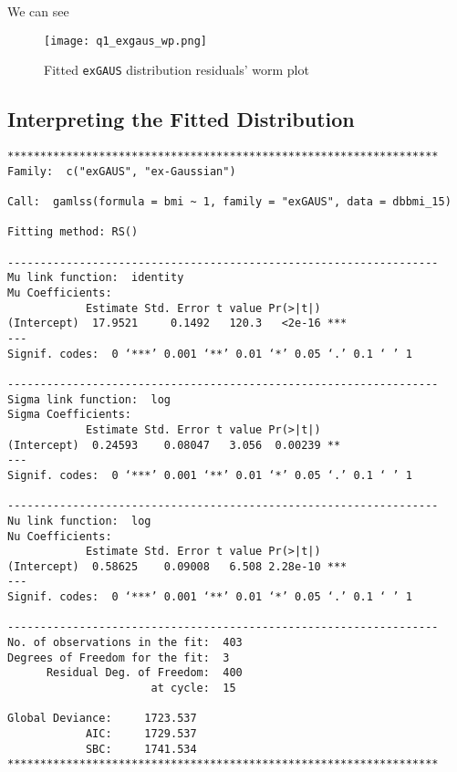 We can see

\begin{figure}[H]
  \texttt{[image: q1\_exgaus\_wp.png]}
  \caption{Fitted \texttt{exGAUS} distribution residuals' worm plot}
\end{figure}

\subsection{Interpreting the Fitted Distribution}

\begin{table}[H]
\begin{verbatim}
******************************************************************
Family:  c("exGAUS", "ex-Gaussian")

Call:  gamlss(formula = bmi ~ 1, family = "exGAUS", data = dbbmi_15)

Fitting method: RS()

------------------------------------------------------------------
Mu link function:  identity
Mu Coefficients:
            Estimate Std. Error t value Pr(>|t|)
(Intercept)  17.9521     0.1492   120.3   <2e-16 ***
---
Signif. codes:  0 ‘***’ 0.001 ‘**’ 0.01 ‘*’ 0.05 ‘.’ 0.1 ‘ ’ 1

------------------------------------------------------------------
Sigma link function:  log
Sigma Coefficients:
            Estimate Std. Error t value Pr(>|t|)
(Intercept)  0.24593    0.08047   3.056  0.00239 **
---
Signif. codes:  0 ‘***’ 0.001 ‘**’ 0.01 ‘*’ 0.05 ‘.’ 0.1 ‘ ’ 1

------------------------------------------------------------------
Nu link function:  log
Nu Coefficients:
            Estimate Std. Error t value Pr(>|t|)
(Intercept)  0.58625    0.09008   6.508 2.28e-10 ***
---
Signif. codes:  0 ‘***’ 0.001 ‘**’ 0.01 ‘*’ 0.05 ‘.’ 0.1 ‘ ’ 1

------------------------------------------------------------------
No. of observations in the fit:  403
Degrees of Freedom for the fit:  3
      Residual Deg. of Freedom:  400
                      at cycle:  15

Global Deviance:     1723.537
            AIC:     1729.537
            SBC:     1741.534
******************************************************************
\end{verbatim}
\caption{Fitted coefficients and their standard errors for \texttt{exGAUS}}
\end{table}



